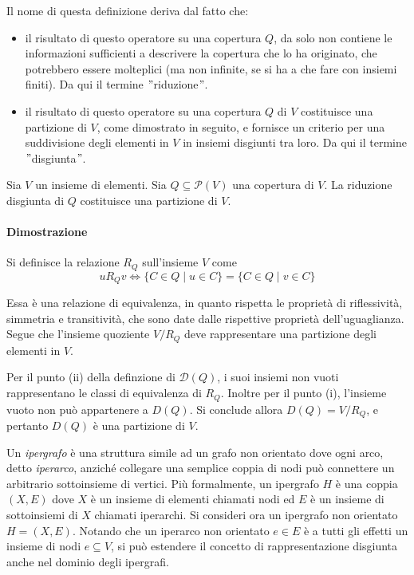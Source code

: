 Il nome di questa definizione deriva dal fatto che:
\begin{itemize}
    \item il risultato di questo operatore su una copertura $Q$, da solo non contiene le informazioni sufficienti a
        descrivere la copertura che lo ha originato, che potrebbero essere molteplici (ma non infinite, se si ha a che
        fare con insiemi finiti). %
        Da qui il termine \("\)riduzione\("\).
    \item il risultato di questo operatore su una copertura $Q$ di $V$ costituisce una partizione di $V$, come
        dimostrato in seguito, e fornisce un criterio per una suddivisione degli elementi in $V$ in insiemi disgiunti
        tra loro.
        Da qui il termine \("\)disgiunta\("\).
\end{itemize}

\begin{proposition}
Sia $V$ un insieme di elementi. Sia $Q \subseteq \mathcal{P}(V)$ una copertura di $V$.
La riduzione disgiunta di $Q$ costituisce una partizione di $V$.
\end{proposition}

\paragraph{Dimostrazione}
Si definisce la relazione $R_Q$ sull'insieme $V$ come
\begin{equation*}
    uR_{Q}v \Leftrightarrow \{C \in Q \mid u \in C\} = \{C \in Q \mid v \in C\}
\end{equation*}

Essa \`e una relazione di equivalenza, in quanto rispetta le propriet\`a di riflessivit\`a, simmetria e transitivit\`a,
che sono date dalle rispettive propriet\`a dell'uguaglianza.
Segue che l'insieme quoziente $V/R_{Q}$ deve rappresentare una partizione degli elementi in $V$.

Per il punto (ii) della definzione di $\mathcal{D}(Q)$, i suoi insiemi non vuoti rappresentano le classi di equivalenza
di $R_Q$.
Inoltre per il punto (i), l'insieme vuoto non pu\`o appartenere a $D(Q)$.
Si conclude allora $D(Q) = V/R_{Q}$, e pertanto $D(Q)$ \`e una partizione di $V$.


Un \textit{ipergrafo} è una struttura simile ad un grafo non orientato dove ogni arco, detto \textit{iperarco},
anziché collegare una semplice coppia di nodi può connettere un arbitrario sottoinsieme di vertici.
Più formalmente, un ipergrafo $H$ è una coppia $(X, E)$ dove $X$ è un insieme di elementi chiamati nodi ed $E$ è
un insieme di sottoinsiemi di $X$ chiamati iperarchi.
Si consideri ora un ipergrafo non orientato $H = (X, E)$.
Notando che un iperarco non orientato $e \in E$ è a tutti gli effetti un insieme di nodi $e \subseteq V$,
si pu\`o estendere il concetto di rappresentazione disgiunta anche nel dominio degli ipergrafi.

